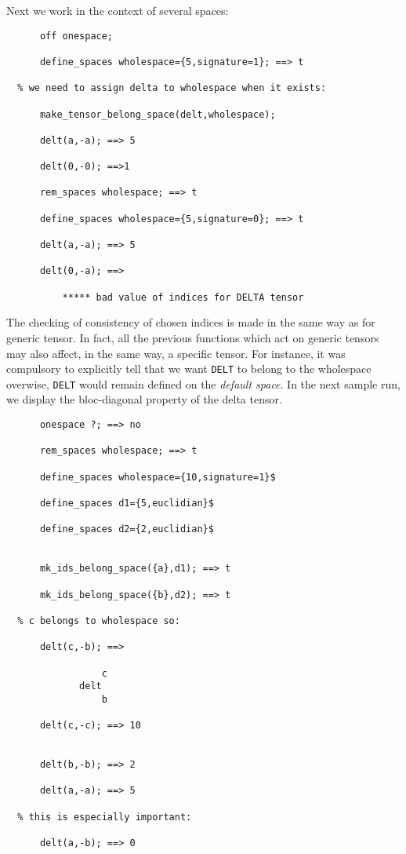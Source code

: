 Next we work in the context of several spaces:
\begin{verbatim}
      off onespace;

      define_spaces wholespace={5,signature=1}; ==> t

  % we need to assign delta to wholespace when it exists:
      
      make_tensor_belong_space(delt,wholespace);

      delt(a,-a); ==> 5

      delt(0,-0); ==>1

      rem_spaces wholespace; ==> t

      define_spaces wholespace={5,signature=0}; ==> t

      delt(a,-a); ==> 5

      delt(0,-a); ==> 

          ***** bad value of indices for DELTA tensor

\end{verbatim}
The checking of consistency of chosen indices is made in the same way as for 
generic tensor. In fact, all the previous functions which act on generic tensors
may also affect, in the same way, a specific tensor. For instance, it was 
compulsory to explicitly tell that we want \texttt{DELT} to belong to the 
wholespace   overwise, 
\texttt{DELT} would remain defined on the \emph{default space}.
In the next sample run,  we display the bloc-diagonal property of 
the  delta tensor.
\begin{verbatim}
      onespace ?; ==> no

      rem_spaces wholespace; ==> t

      define_spaces wholespace={10,signature=1}$

      define_spaces d1={5,euclidian}$
 
      define_spaces d2={2,euclidian}$


      mk_ids_belong_space({a},d1); ==> t

      mk_ids_belong_space({b},d2); ==> t

  % c belongs to wholespace so:

      delt(c,-b); ==>

                 c
             delt
                 b

      delt(c,-c); ==> 10


      delt(b,-b); ==> 2

      delt(a,-a); ==> 5

  % this is especially important:

      delt(a,-b); ==> 0
\end{verbatim}
